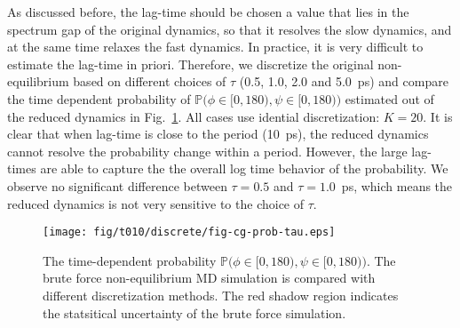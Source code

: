 \documentclass[aps, pre, preprint,unsortedaddress,a4paper,onecolumn]{revtex4}
\newcommand{\vect}[1]{\textbf{\textit{#1}}}
\newcommand{\confaa}[0]{{\alpha_{\textrm{R}}}}
\newcommand{\confab}[0]{{\alpha_{\textrm{R}}'}}
\newcommand{\confba}[0]{{\textrm{C}7_{\textrm{eq}}}}
\newcommand{\confbb}[0]{{\textrm{C}5}}
\newcommand{\confc}[0]{{\alpha_{\textrm{L}}}}
\begin{document}
As discussed before, the lag-time should be chosen a value that lies
in the spectrum gap of the original dynamics, so that it resolves the
slow dynamics, and at the same time relaxes the fast dynamics. In
practice, it is very difficult to estimate the lag-time in
priori. Therefore, we discretize the original non-equilibrium based on
different choices of $\tau$ (0.5, 1.0, 2.0 and 5.0~ps) and compare the
time dependent probability of $\mathbb P\big(\phi\in[0,180), \psi\in
[0,180)\big)$ estimated out of the reduced dynamics in
Fig.~\ref{fig:tmp3}.  All cases use idential discretization: $K=20$.
It is clear that when lag-time is close to the period (10~ps), the
reduced dynamics cannot resolve the probability change within a
period. However, the large lag-times are able to capture the
the overall log time behavior of the probability.
We observe no significant difference between $\tau=0.5$ and
$\tau=1.0$~ps, which means the reduced dynamics is not very sensitive
to the choice of $\tau$. 


\begin{figure}
  \centering
  \texttt{[image: fig/t010/discrete/fig-cg-prob-tau.eps]}  
  \caption{The time-dependent probability $\mathbb
    P\big(\phi\in[0,180), \psi\in [0,180)\big)$.  The brute force
    non-equilibrium MD simulation is compared with different
    discretization methods. The red shadow region indicates the
    statsitical uncertainty of the brute force simulation.}
  \label{fig:tmp3}
\end{figure}


\end{document}
